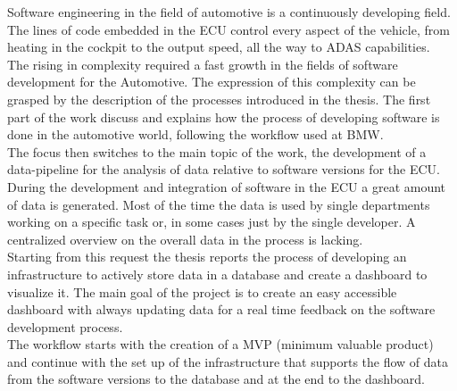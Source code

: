 \documentclass[../main.tex]{subfiles}
\begin{document}
Software engineering in the field of automotive is a continuously developing field. The lines of code embedded in the ECU control every aspect of the vehicle, from heating in the cockpit to the output speed, all the way to ADAS capabilities.\\
The rising in complexity required a fast growth in the fields of software development for the Automotive. The expression of this complexity can be grasped by the description of the processes introduced in the thesis. The first part of the work discuss and explains how the process of developing software is done in the automotive world, following the workflow used at BMW.\\
The focus then switches to the main topic of the work, the development of a data-pipeline for the analysis of data relative to software versions for the ECU. During the development and integration of software in the ECU a great amount of data is generated. Most of the time the data is used by single departments working on a specific task or, in some cases just by the single developer. A centralized overview on the overall data in the process is lacking.\\
Starting from this request the thesis reports the process of developing an infrastructure to actively store data in a database and create a dashboard to visualize it. The main goal of the project is to create an easy accessible dashboard with always updating data for a real time feedback on the software development process.\\
The workflow starts with the creation of a MVP (minimum valuable product) and continue with the set up of the infrastructure that supports the flow of data from the software versions to the database and at the end to the dashboard.\\

\cleardoublepage
\end{document}
